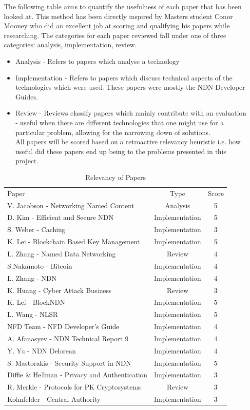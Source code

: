 The following table aims to quantify the usefulness of each paper that has been looked at. This method has been directly inspired by Masters student Conor Mooney who did an excellent job at scoring and qualifying his papers while researching. The categories for each paper reviewed fall under one of three categories: analysis, implementation, review.\\
\begin{itemize}
\item Analysis - Refers to papers which analyse a technology\\
\item Implementation - Refers to papers which discuss technical aspects of the technologies which were used. These papers were mostly the NDN Developer Guides.\\
\item Review - Reviews classify papers which mainly contribute with an evaluation - useful when there are different technologies that one might use for a particular problem, allowing for the narrowing down of solutions.\\
\vfill
All papers will be scored based on a retroactive relevancy heuristic i.e. how useful did these papers end up being to the problems presented in this project. 
\end{itemize}
\begin{table} [!htb]
\caption{Relevancy of Papers}
\centering
\begin{tabular}{l|c|c}
Paper & Type & Score \\ 
V. Jacobson - Networking Named Content & Analysis & 5\\
D. Kim - Efficient and Secure NDN & Implementation & 5\\
S. Weber - Caching & Implementation & 3\\
K. Lei - Blockchain Based Key Management & Implementation & 5\\
L. Zhang - Named Data Networking & Review & 4\\
S.Nakamoto - Bitcoin & Implementation & 4 \\
L. Zhang - NDN & Implementation & 4 \\
K. Huang - Cyber Attack Business & Review & 3 \\  
K. Lei - BlockNDN & Implementation & 5 \\ 
L. Wang - NLSR & Implementation & 5 \\ 
NFD Team - NFD Developer's Guide & Implementation & 4 \\ 
A. Afanasyev - NDN Technical Report 9 & Implementation & 4 \\ 
Y. Yu - NDN Delorean & Implementation & 4\\
S. Mastorakis - Security Support in NDN & Implementation & 5\\
Diffie \& Hellman - Privacy and Authentication & Implementation & 3 \\
R. Merkle - Protocols for PK Cryptosystems & Review & 3 \\
Kohnfelder - Central Authority & Implementation & 3

\end{tabular}
\end{table}
